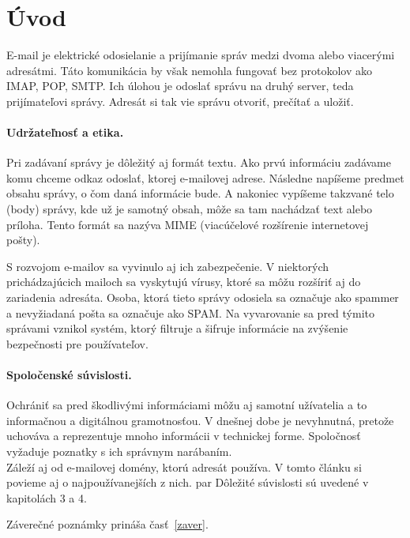 \documentclass[10pt,twoside,slovak,a4paper]{article}
\begin{document}
\section{Úvod}
\hspace{0.5cm}E-mail je elektrické odosielanie a prijímanie správ medzi dvoma alebo viacerými adresátmi. Táto komunikácia by však nemohla fungovať bez protokolov ako IMAP, POP, SMTP. Ich úlohou je odoslať správu na druhý server, teda prijímateľovi správy. Adresát si tak vie správu otvoriť, prečítať a uložiť.\par
\vspace{-0.8cm}
\hspace{0.5cm}\paragraph{Udržateľnosť a etika.}Pri zadávaní správy je dôležitý aj formát textu. Ako prvú informáciu zadávame komu chceme odkaz odoslať, ktorej e-mailovej adrese. Následne napíšeme predmet obsahu správy, o čom daná informácie bude. A nakoniec vypíšeme takzvané telo (body) správy, kde už je samotný obsah, môže sa tam nachádzať text alebo príloha. Tento formát sa nazýva MIME (viacúčelové rozšírenie internetovej pošty).\par
\vspace{0.15cm}
\hspace{0.5cm}S rozvojom e-mailov sa vyvinulo aj ich zabezpečenie. V niektorých prichádzajúcich mailoch sa vyskytujú vírusy, ktoré sa môžu rozšíriť aj do zariadenia adresáta. Osoba, ktorá tieto správy odosiela sa označuje ako spammer a nevyžiadaná pošta sa označuje ako SPAM. Na vyvarovanie sa pred týmito správami vznikol systém, ktorý filtruje a šifruje informácie na zvýšenie bezpečnosti pre používateľov.
\vspace{-0.2cm}
\paragraph{Spoločenské súvislosti.}Ochrániť sa pred škodlivými informáciami môžu aj samotní užívatelia a to informačnou a digitálnou gramotnosťou. V dnešnej dobe je nevyhnutná, pretože uchováva a reprezentuje mnoho informácii v technickej forme. Spoločnosť vyžaduje poznatky s ich správnym narábaním.  \\
\vspace{0.2cm}
\hspace{0.5cm}Záleží aj od e-mailovej domény, ktorú adresát používa. V tomto článku si povieme aj o najpoužívanejších z nich. par
Dôležité súvislosti sú uvedené v kapitolách 3 a 4.\par
\vspace{0.15cm}
\hspace{1cm}Záverečné poznámky prináša časť~\ref{zaver}.
\end{document}

